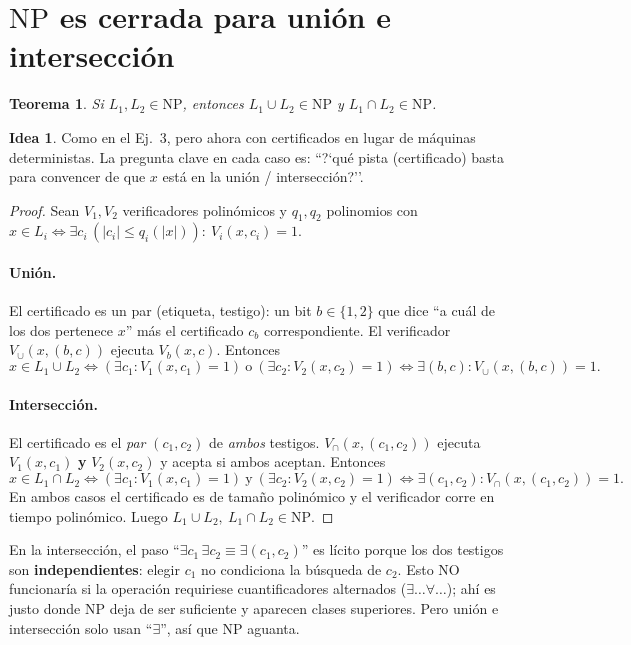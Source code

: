 \documentclass[11pt,a4paper]{article}
\theoremstyle{plain}
\newtheorem{teorema}{Teorema}
\theoremstyle{definition}
\newtheorem*{idea}{Idea}
\newcommand{\NP}{\mathrm{NP}}
\begin{document}
\section{$\NP$ es cerrada para uni\'on e intersecci\'on}

\begin{teorema}
Si $L_1,L_2\in\NP$, entonces $L_1\cup L_2\in\NP$ y $L_1\cap L_2\in\NP$.
\end{teorema}

\begin{idea}
Como en el Ej.\ 3, pero ahora con certificados en lugar de m\'aquinas deterministas.
La pregunta clave en cada caso es: ``?`qu\'e pista (certificado) basta para convencer
de que $x$ est\'a en la uni\'on / intersecci\'on?''.
\end{idea}

\begin{proof}
Sean $V_1,V_2$ verificadores polin\'omicos y $q_1,q_2$ polinomios con
$x\in L_i\iff \exists c_i\,(|c_i|\le q_i(|x|)):\ V_i(x,c_i)=1$.

\paragraph{Uni\'on.} El certificado es un par (etiqueta, testigo): un bit
$b\in\{1,2\}$ que dice ``a cu\'al de los dos pertenece $x$'' m\'as el certificado
$c_b$ correspondiente. El verificador $V_\cup(x,(b,c))$ ejecuta $V_b(x,c)$. Entonces
\[
x\in L_1\cup L_2 \iff (\exists c_1: V_1(x,c_1)=1)\ \text{o}\ (\exists c_2:
V_2(x,c_2)=1) \iff \exists (b,c): V_\cup(x,(b,c))=1 .
\]

\paragraph{Intersecci\'on.} El certificado es el \emph{par} $(c_1,c_2)$ de \emph{ambos}
testigos. $V_\cap(x,(c_1,c_2))$ ejecuta $V_1(x,c_1)$ \textbf{y} $V_2(x,c_2)$ y acepta
si ambos aceptan. Entonces
\[
x\in L_1\cap L_2 \iff (\exists c_1: V_1(x,c_1)=1)\ \text{y}\ (\exists c_2:
V_2(x,c_2)=1)\iff \exists(c_1,c_2): V_\cap(x,(c_1,c_2))=1 .
\]
En ambos casos el certificado es de tama\~no polin\'omico y el verificador corre en
tiempo polin\'omico. Luego $L_1\cup L_2,\ L_1\cap L_2\in\NP$.
\end{proof}

\begin{cuidado}
En la intersecci\'on, el paso ``$\exists c_1\,\exists c_2 \equiv \exists (c_1,c_2)$''
es l\'icito porque los dos testigos son \textbf{independientes}: elegir $c_1$ no
condiciona la b\'usqueda de $c_2$. Esto NO funcionar\'ia si la operaci\'on requiriese
cuantificadores alternados ($\exists\dots\forall\dots$); ah\'i es justo donde $\NP$
deja de ser suficiente y aparecen clases superiores. Pero uni\'on e intersecci\'on
solo usan ``$\exists$'', as\'i que $\NP$ aguanta.
\end{cuidado}
\end{document}
